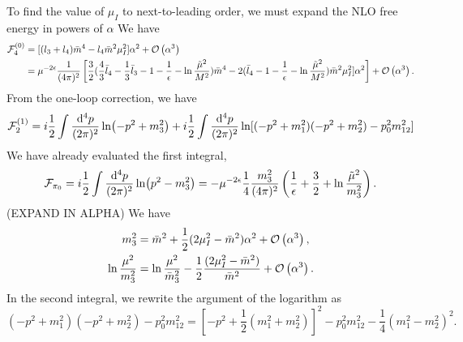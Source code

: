 To find the value of $\mu_I$ to next-to-leading order, we must expand the NLO free energy in powers of $\alpha$
We have
\begin{align}
    \Ef_4^{(0)}
    &= [(l_3 + l_4)\bar m^4 -l_4 \bar m^2\mu_I^2]\alpha^2 + \Oh[3]{\alpha} 
    \\
    &
    = \mu^{-2\epsilon} \frac{1}{(4\pi)^2}
    \left[
        \frac{3}{2}
        (
            \frac{4}{3}\bar l_4 - \frac{1}{3}\bar l_3 - 1 - \frac{1}{\epsilon} - \ln\frac{\tilde \mu^2}{M^2}
        )\bar m^4
        -2(\bar l_4 - 1 - \frac{1}{\epsilon} - \ln\frac{\tilde \mu^2}{M^2}) \bar m^2\mu_I^2]\alpha^2
    \right]
    + \Oh[3]{\alpha}.
\end{align}
From the one-loop correction, we have
\begin{equation}
    \Ef_2^{(1)} = i \frac{1}{2}\int \frac{\dd^4 p}{(2\pi)^2} \ln(-p^2 + m_3^2)
    +  i \frac{1}{2} \int \frac{\dd^4 p}{(2\pi)^2} \ln[(-p^2 + m_1^2)(-p^2 + m_2^2) - p_0^2 m_{12}^2]
\end{equation}
We have already evaluated the first integral,
\begin{equation}
    \Ef_{\pi_0} 
    = i \frac{1}{2}\int \frac{\dd^4 p}{(2\pi)^2} \ln(p^2 - m_3^2)
    = - \mu^{-2\epsilon}\frac{1}{4} \frac{m_3^2}{(4 \pi)^2}
    \left(\frac{1}{\epsilon} + \frac{3}{2} + \ln \frac{\tilde \mu^2}{m_3^2}\right).
\end{equation}
(EXPAND IN ALPHA)
We have
\begin{align*}
    m_3^2 
    &= \bar m^2 + \frac{1}{2}(2\mu_I^2 - \bar m^2)\alpha^2+ \Oh[3]{\alpha}, \\
    \ln \frac{\mu^2}{m_3^2}
    &=
    \ln \frac{\mu^2}{\bar m_3^2} - \frac{1}{2} \frac{(2\mu_I^2 - \bar m^2)}{\bar m^2}+ \Oh[3]{\alpha}.
\end{align*}
In the second integral, we rewrite the argument of the logarithm as
\begin{equation}
    (-p^2 + m_1^2)(-p^2 + m_2^2) - p_0^2 m_{12}^2
    =  \left[-p^2 + \frac{1}{2}(m_1^2 + m_2^2)\right]^2 - p_0^2 m_{12}^2 - \frac{1}{4}(m_1^2 - m_2^2)^2.
\end{equation}
